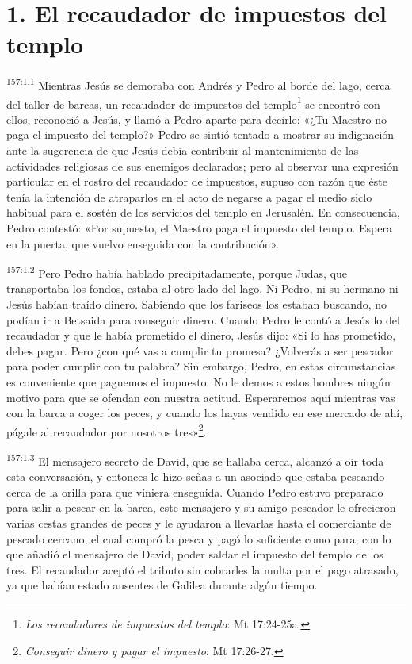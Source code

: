 \section*{1. El recaudador de impuestos del templo}
\par 
\textsuperscript{157:1.1} Mientras Jesús se demoraba con Andrés y Pedro al borde del lago, cerca del taller de barcas, un recaudador de impuestos del templo\footnote{\textit{Los recaudadores de impuestos del templo}: Mt 17:24-25a.} se encontró con ellos, reconoció a Jesús, y llamó a Pedro aparte para decirle: «¿Tu Maestro no paga el impuesto del templo?» Pedro se sintió tentado a mostrar su indignación ante la sugerencia de que Jesús debía contribuir al mantenimiento de las actividades religiosas de sus enemigos declarados; pero al observar una expresión particular en el rostro del recaudador de impuestos, supuso con razón que éste tenía la intención de atraparlos en el acto de negarse a pagar el medio siclo habitual para el sostén de los servicios del templo en Jerusalén. En consecuencia, Pedro contestó: «Por supuesto, el Maestro paga el impuesto del templo. Espera en la puerta, que vuelvo enseguida con la contribución».

\par 
\textsuperscript{157:1.2} Pero Pedro había hablado precipitadamente, porque Judas, que transportaba los fondos, estaba al otro lado del lago. Ni Pedro, ni su hermano ni Jesús habían traído dinero. Sabiendo que los fariseos los estaban buscando, no podían ir a Betsaida para conseguir dinero. Cuando Pedro le contó a Jesús lo del recaudador y que le había prometido el dinero, Jesús dijo: «Si lo has prometido, debes pagar. Pero ¿con qué vas a cumplir tu promesa? ¿Volverás a ser pescador para poder cumplir con tu palabra? Sin embargo, Pedro, en estas circunstancias es conveniente que paguemos el impuesto. No le demos a estos hombres ningún motivo para que se ofendan con nuestra actitud. Esperaremos aquí mientras vas con la barca a coger los peces, y cuando los hayas vendido en ese mercado de ahí, págale al recaudador por nosotros tres»\footnote{\textit{Conseguir dinero y pagar el impuesto}: Mt 17:26-27.}.

\par 
\textsuperscript{157:1.3} El mensajero secreto de David, que se hallaba cerca, alcanzó a oír toda esta conversación, y entonces le hizo señas a un asociado que estaba pescando cerca de la orilla para que viniera enseguida. Cuando Pedro estuvo preparado para salir a pescar en la barca, este mensajero y su amigo pescador le ofrecieron varias cestas grandes de peces y le ayudaron a llevarlas hasta el comerciante de pescado cercano, el cual compró la pesca y pagó lo suficiente como para, con lo que añadió el mensajero de David, poder saldar el impuesto del templo de los tres. El recaudador aceptó el tributo sin cobrarles la multa por el pago atrasado, ya que habían estado ausentes de Galilea durante algún tiempo.

